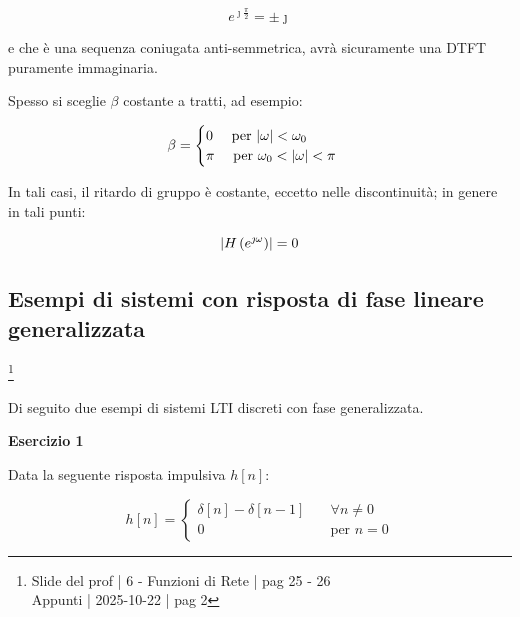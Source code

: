 {
    \Large 
    \begin{equation}
        e^{\jmath \frac{\pi}{2}}
        = 
        \pm \jmath
    \end{equation}
}

e che è una sequenza coniugata anti-semmetrica, 
avrà sicuramente una DTFT puramente immaginaria. \newline 

Spesso si sceglie $\beta$ costante a tratti, ad esempio: 

{
    \Large 
    \begin{equation}
        \beta 
        = 
        \begin{cases}
            0 \quad \text{ per } \abs{\omega} < \omega_0 
            \\
            \pi \quad \text{ per } \omega_0 < \abs{\omega} < \pi  
        \end{cases}
    \end{equation}
}

In tali casi, il ritardo di gruppo è costante, eccetto nelle discontinuità; 
in genere in tali punti: 

{
    \Large 
    \begin{equation}
        \abs{H \left( e^{\jmath \omega}\right)} = 0
    \end{equation}
}

\newpage 

\subsection{Esempi di sistemi con risposta di fase lineare generalizzata}

\footnote{ 
    Slide del prof | 6 - Funzioni di Rete | pag 25 - 26\\
    Appunti | 2025-10-22 | pag 2
} 

Di seguito due esempi di sistemi LTI discreti con fase generalizzata. \newline 

\textbf{Esercizio 1} \newline 

Data la seguente risposta impulsiva $h \left[ n\right]$: 

{
    \Large 
    \begin{equation}
        h \left[ n\right]
        = 
        \begin{cases}
        \delta \left[ n\right] 
        -
        \delta \left[ n - 1\right] \quad &\forall n \neq 0 
        \\
        0 \quad &\text{per } n = 0       
        \end{cases}
    \end{equation}
}

